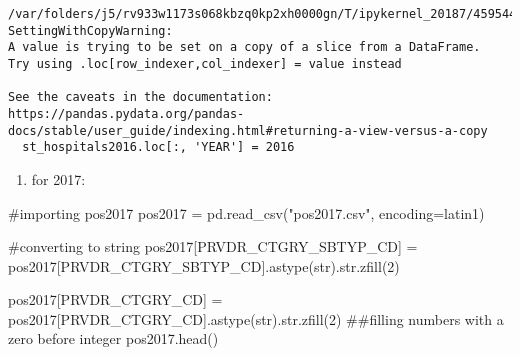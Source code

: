 \documentclass[
  letterpaper,
  DIV=11,
  numbers=noendperiod]{scrartcl}
\newenvironment{Shaded}{\begin{snugshade}}{\end{snugshade}}
\newcommand{\BuiltInTok}[1]{\textcolor[rgb]{0.00,0.23,0.31}{#1}}
\newcommand{\CommentTok}[1]{\textcolor[rgb]{0.37,0.37,0.37}{#1}}
\newcommand{\DecValTok}[1]{\textcolor[rgb]{0.68,0.00,0.00}{#1}}
\newcommand{\NormalTok}[1]{\textcolor[rgb]{0.00,0.23,0.31}{#1}}
\newcommand{\OperatorTok}[1]{\textcolor[rgb]{0.37,0.37,0.37}{#1}}
\newcommand{\StringTok}[1]{\textcolor[rgb]{0.13,0.47,0.30}{#1}}
\providecommand{\tightlist}{%
  \setlength{\itemsep}{0pt}\setlength{\parskip}{0pt}}\usepackage{longtable,booktabs,array}
\begin{document}
\begin{verbatim}
/var/folders/j5/rv933w1173s068kbzq0kp2xh0000gn/T/ipykernel_20187/459544367.py:1: SettingWithCopyWarning: 
A value is trying to be set on a copy of a slice from a DataFrame.
Try using .loc[row_indexer,col_indexer] = value instead

See the caveats in the documentation: https://pandas.pydata.org/pandas-docs/stable/user_guide/indexing.html#returning-a-view-versus-a-copy
  st_hospitals2016.loc[:, 'YEAR'] = 2016
\end{verbatim}

\begin{enumerate}
\def\labelenumi{\arabic{enumi}.}
\setcounter{enumi}{2}
\tightlist
\item
  for 2017:
\end{enumerate}

\begin{Shaded}
\begin{Highlighting}[]
\CommentTok{\#importing pos2017}
\NormalTok{pos2017 }\OperatorTok{=}\NormalTok{ pd.read\_csv(}\StringTok{"pos2017.csv"}\NormalTok{, encoding}\OperatorTok{=}\StringTok{\textquotesingle{}latin1\textquotesingle{}}\NormalTok{)}
\end{Highlighting}
\end{Shaded}

\begin{Shaded}
\begin{Highlighting}[]
\CommentTok{\#converting to string}
\NormalTok{pos2017[}\StringTok{\textquotesingle{}PRVDR\_CTGRY\_SBTYP\_CD\textquotesingle{}}\NormalTok{] }\OperatorTok{=}\NormalTok{ pos2017[}\StringTok{\textquotesingle{}PRVDR\_CTGRY\_SBTYP\_CD\textquotesingle{}}\NormalTok{].astype(}\BuiltInTok{str}\NormalTok{).}\BuiltInTok{str}\NormalTok{.zfill(}\DecValTok{2}\NormalTok{)}

\NormalTok{pos2017[}\StringTok{\textquotesingle{}PRVDR\_CTGRY\_CD\textquotesingle{}}\NormalTok{] }\OperatorTok{=}\NormalTok{ pos2017[}\StringTok{\textquotesingle{}PRVDR\_CTGRY\_CD\textquotesingle{}}\NormalTok{].astype(}\BuiltInTok{str}\NormalTok{).}\BuiltInTok{str}\NormalTok{.zfill(}\DecValTok{2}\NormalTok{) }\CommentTok{\#\#filling numbers with a zero before integer}
\NormalTok{pos2017.head()}
\end{Highlighting}
\end{Shaded}
\end{document}
